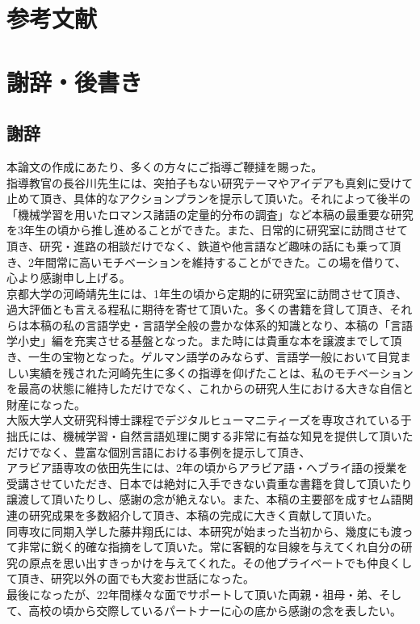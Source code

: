 \documentclass[12pt, oneside]{book}
\begin{document}
\part{参考文献}
\part{謝辞・後書き}
\chapter{謝辞}
本論文の作成にあたり、多くの方々にご指導ご鞭撻を賜った。
\\指導教官の長谷川先生には、突拍子もない研究テーマやアイデアも真剣に受けて止めて頂き、具体的なアクションプランを提示して頂いた。それによって後半の「機械学習を用いたロマンス諸語の定量的分布の調査」など本稿の最重要な研究を3年生の頃から推し進めることができた。また、日常的に研究室に訪問させて頂き、研究・進路の相談だけでなく、鉄道や他言語など趣味の話にも乗って頂き、2年間常に高いモチベーションを維持することができた。この場を借りて、心より感謝申し上げる。
\\京都大学の河崎靖先生には、1年生の頃から定期的に研究室に訪問させて頂き、過大評価とも言える程私に期待を寄せて頂いた。多くの書籍を貸して頂き、それらは本稿の私の言語学史・言語学全般の豊かな体系的知識となり、本稿の「言語学小史」編を充実させる基盤となった。また時には貴重な本を譲渡までして頂き、一生の宝物となった。ゲルマン語学のみならず、言語学一般において目覚ましい実績を残された河崎先生に多くの指導を仰げたことは、私のモチベーションを最高の状態に維持しただけでなく、これからの研究人生における大きな自信と財産になった。
\\大阪大学人文研究科博士課程でデジタルヒューマニティーズを専攻されている于拙氏には、機械学習・自然言語処理に関する非常に有益な知見を提供して頂いただけでなく、豊富な個別言語における事例を提示して頂き、
\\アラビア語専攻の依田先生には、2年の頃からアラビア語・ヘブライ語の授業を受講させていただき、日本では絶対に入手できない貴重な書籍を貸して頂いたり譲渡して頂いたりし、感謝の念が絶えない。また、本稿の主要部を成すセム語関連の研究成果を多数紹介して頂き、本稿の完成に大きく貢献して頂いた。
\\同専攻に同期入学した藤井翔氏には、本研究が始まった当初から、幾度にも渡って非常に鋭く的確な指摘をして頂いた。常に客観的な目線を与えてくれ自分の研究の原点を思い出すきっかけを与えてくれた。その他プライベートでも仲良くして頂き、研究以外の面でも大変お世話になった。
\\最後になったが、22年間様々な面でサポートして頂いた両親・祖母・弟、そして、高校の頃から交際しているパートナーに心の底から感謝の念を表したい。
\backmatter

 
\end{document}

